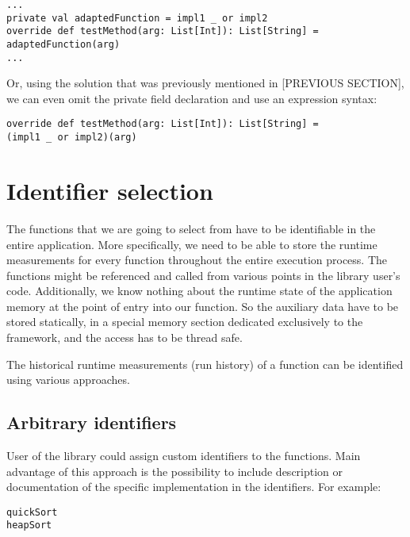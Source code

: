 \lstset{style=Scala}
\begin{lstlisting}
...
private val adaptedFunction = impl1 _ or impl2
override def testMethod(arg: List[Int]): List[String] = 
adaptedFunction(arg)
...
\end{lstlisting}

Or, using the solution that was previously mentioned in [PREVIOUS SECTION], we can even omit the private field declaration and use an expression syntax:

\lstset{style=Scala}
\begin{lstlisting}
override def testMethod(arg: List[Int]): List[String] = 
(impl1 _ or impl2)(arg)
\end{lstlisting}



\section{Identifier selection}

The functions that we are going to select from have to be identifiable in the entire application. More specifically, we need to be able to store the runtime measurements for every function throughout the entire execution process. The functions might be referenced and called from various points in the library user's code. Additionally, we know nothing about the runtime state of the application memory at the point of entry into our function. So the auxiliary data have to be stored statically, in a special memory section dedicated exclusively to the framework, and the access has to be thread safe.


The historical runtime measurements (run history) of a function can be identified using various approaches.

\subsection{Arbitrary identifiers}
User of the library could assign custom identifiers to the functions. Main advantage of this approach is the possibility to include description or documentation of the specific implementation in the identifiers. For example:

\begin{lstlisting}
quickSort
heapSort
\end{lstlisting}

